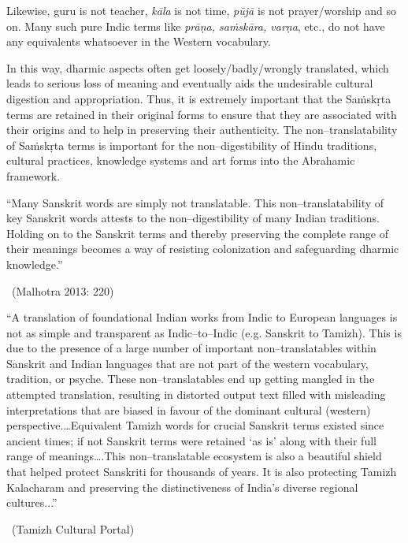 Likewise, guru is not teacher, \textit{kāla} is not time, \textit{pūjā} is not prayer/worship and so on. Many such pure Indic terms like \textit{prāṇa, saṁskāra, varṇa}, etc., do not have any equivalents whatsoever in the Western vocabulary.

In this way, dharmic aspects often get loosely/badly/wrongly translated, which leads to serious loss of meaning and eventually aids the undesirable cultural digestion and appropriation. Thus, it is extremely important that the Saṁskṛta terms are retained in their original forms to ensure that they are associated with their origins and to help in preserving their authenticity. The non–translatability of Saṁskṛta terms is important for the non–digestibility of Hindu traditions, cultural practices, knowledge systems and art forms into the Abrahamic framework.

\begin{myquote}
“Many Sanskrit words are simply not translatable. This non–translatability of key Sanskrit words attests to the non–digestibility of many Indian traditions. Holding on to the Sanskrit terms and thereby preserving the complete range of their meanings becomes a way of resisting colonization and safeguarding dharmic knowledge.” 

~\hfill (Malhotra 2013: 220)
\end{myquote}

\begin{myquote}
“A translation of foundational Indian works from Indic to European languages is not as simple and transparent as Indic–to–Indic (e.g. Sanskrit to Tamizh). This is due to the presence of a large number of important non–translatables within Sanskrit and Indian languages that are not part of the western vocabulary, tradition, or psyche. These non–translatables end up getting mangled in the attempted translation, resulting in distorted output text filled with misleading interpretations that are biased in favour of the dominant cultural (western) perspective.…Equivalent Tamizh words for crucial Sanskrit terms existed since ancient times; if not Sanskrit terms were retained ‘as is’ along with their full range of meanings….This non–translatable ecosystem is also a beautiful shield that helped protect Sanskriti for thousands of years. It is also protecting Tamizh Kalacharam and preserving the distinctiveness of India’s diverse regional cultures...” 

~\hfill (Tamizh Cultural Portal)
\end{myquote}


